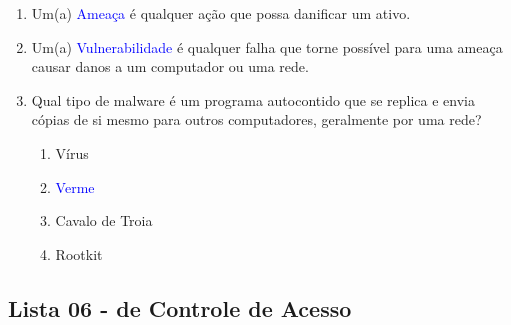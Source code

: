 \documentclass{report}
\begin{document}
\begin{enumerate}
		\item Um(a) \textcolor{blue}{Ameaça} é qualquer ação que possa danificar um ativo.
		
		\item Um(a) \textcolor{blue}{Vulnerabilidade} é qualquer falha que torne possível para uma ameaça causar danos a um computador ou uma rede.
		
		\item Qual tipo de malware é um programa autocontido que se replica e envia cópias de si mesmo para outros computadores, geralmente por uma rede?  
		\begin{enumerate}[label=(\alph*)]
			\item Vírus
			\item \textcolor{blue}{Verme}
			\item Cavalo de Troia
			\item Rootkit
		\end{enumerate}
		
	\end{enumerate}
	
	
	
	
	\subsection{Lista 06 - de Controle de Acesso}
	
\end{document}
